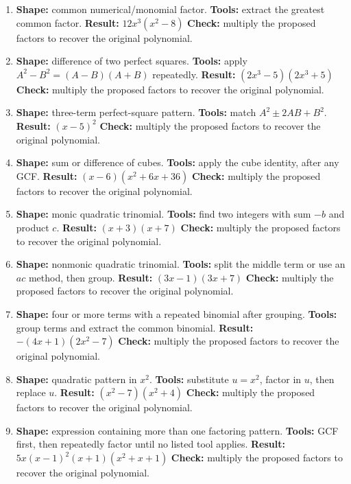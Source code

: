 \documentclass[11pt,oneside]{book}
\begin{document}
\begin{enumerate}[leftmargin=*,label=\textbf{CAP\arabic*.},itemsep=0.45\baselineskip]
\item \textbf{Shape:} common numerical/monomial factor. \textbf{Tools:} extract the greatest common factor. \textbf{Result:} $ 12 x^{3} \left(x^{2} - 8\right) $ \textbf{Check:} multiply the proposed factors to recover the original polynomial.
\item \textbf{Shape:} difference of two perfect squares. \textbf{Tools:} apply $A^2-B^2=(A-B)(A+B)$ repeatedly. \textbf{Result:} $ \left(2 x^{3} - 5\right) \left(2 x^{3} + 5\right) $ \textbf{Check:} multiply the proposed factors to recover the original polynomial.
\item \textbf{Shape:} three-term perfect-square pattern. \textbf{Tools:} match $A^2\pm2AB+B^2$. \textbf{Result:} $ \left(x - 5\right)^{2} $ \textbf{Check:} multiply the proposed factors to recover the original polynomial.
\item \textbf{Shape:} sum or difference of cubes. \textbf{Tools:} apply the cube identity, after any GCF. \textbf{Result:} $ \left(x - 6\right) \left(x^{2} + 6 x + 36\right) $ \textbf{Check:} multiply the proposed factors to recover the original polynomial.
\item \textbf{Shape:} monic quadratic trinomial. \textbf{Tools:} find two integers with sum $-b$ and product $c$. \textbf{Result:} $ \left(x + 3\right) \left(x + 7\right) $ \textbf{Check:} multiply the proposed factors to recover the original polynomial.
\item \textbf{Shape:} nonmonic quadratic trinomial. \textbf{Tools:} split the middle term or use an $ac$ method, then group. \textbf{Result:} $ \left(3 x - 1\right) \left(3 x + 7\right) $ \textbf{Check:} multiply the proposed factors to recover the original polynomial.
\item \textbf{Shape:} four or more terms with a repeated binomial after grouping. \textbf{Tools:} group terms and extract the common binomial. \textbf{Result:} $ - \left(4 x + 1\right) \left(2 x^{2} - 7\right) $ \textbf{Check:} multiply the proposed factors to recover the original polynomial.
\item \textbf{Shape:} quadratic pattern in $x^2$. \textbf{Tools:} substitute $u=x^2$, factor in $u$, then replace $u$. \textbf{Result:} $ \left(x^{2} - 7\right) \left(x^{2} + 4\right) $ \textbf{Check:} multiply the proposed factors to recover the original polynomial.
\item \textbf{Shape:} expression containing more than one factoring pattern. \textbf{Tools:} GCF first, then repeatedly factor until no listed tool applies. \textbf{Result:} $ 5 x \left(x - 1\right)^{2} \left(x + 1\right) \left(x^{2} + x + 1\right) $ \textbf{Check:} multiply the proposed factors to recover the original polynomial.

\end{enumerate}
\end{document}
